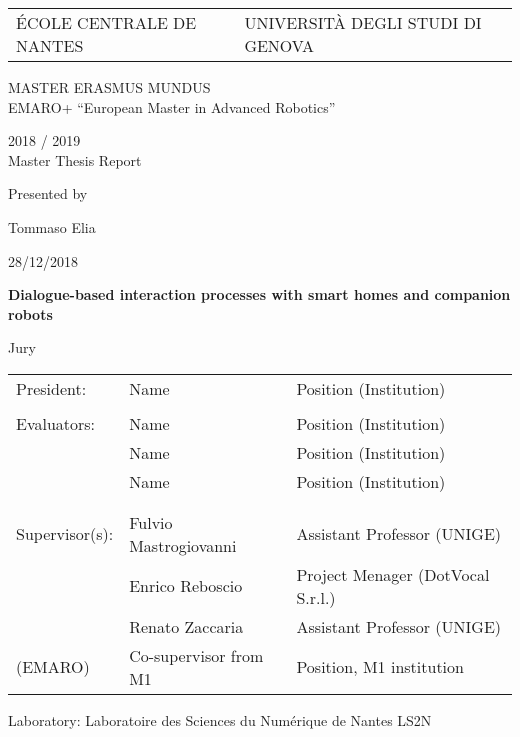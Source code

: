 \thispagestyle{empty}

\def\lskip{\vspace{0.5cm}}


\begin{tabular}{p{7cm}p{10cm}}
ÉCOLE CENTRALE DE NANTES
&
\raggedleft UNIVERSITÀ DEGLI STUDI DI GENOVA	%
\end{tabular}

\vspace{2cm}

\begin{center} \large\sc MASTER ERASMUS MUNDUS \\ \normalsize{EMARO+ ``European Master in Advanced Robotics''} \end{center}


\begin{center}
	2018 / 2019\\
	\lskip
	Master Thesis Report
	\lskip
	
	Presented by \lskip 
	
	Tommaso Elia \lskip
	
	28/12/2018 \lskip\lskip
	
	{\Large \textbf{Dialogue-based interaction processes with smart homes and companion robots}}
	
	\vfill

Jury \lskip
		
	\end{center}
	


\begin{tabular}{p{3cm}p{6cm}p{6cm} }
 President: & Name & Position (Institution) \\ & & \\ 
 Evaluators: & Name & Position (Institution) \\
	      & Name & Position (Institution) \\ 
	      & Name & Position (Institution) \\ & & \\  & & \\ 
  Supervisor(s):  & Fulvio Mastrogiovanni & Assistant Professor (UNIGE)\\
		  & Enrico Reboscio & Project Menager (DotVocal S.r.l.) \\
		  & Renato Zaccaria & Assistant Professor (UNIGE) \\
(EMARO)  & Co-supervisor from M1 & Position, M1 institution 
\end{tabular}

\lskip

\begin{flushleft}
 Laboratory: Laboratoire des Sciences du Numérique de Nantes LS2N
\end{flushleft}

\newpage
\thispagestyle{empty}
\null
\newpage
\addtocounter{page}{-1}
\pagestyle{fancy}
